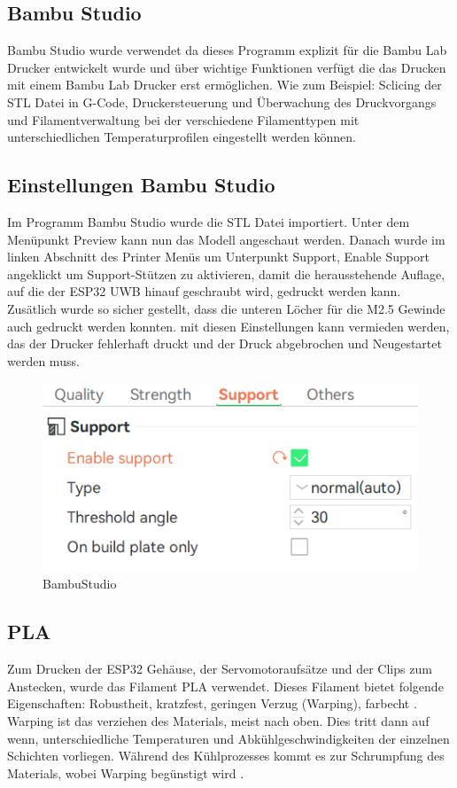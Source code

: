 \subsection{Bambu Studio}
Bambu Studio wurde verwendet da dieses Programm explizit für die Bambu Lab Drucker entwickelt wurde und über wichtige Funktionen verfügt die das Drucken mit einem Bambu Lab Drucker erst ermöglichen. Wie zum Beispiel: Sclicing der STL Datei in G-Code, Druckersteuerung und Überwachung des Druckvorgangs und Filamentverwaltung bei der verschiedene Filamenttypen mit unterschiedlichen Temperaturprofilen eingestellt werden können.


\subsection{Einstellungen Bambu Studio}
Im Programm Bambu Studio wurde die STL Datei importiert. Unter dem Menüpunkt Preview kann nun das Modell angeschaut werden. Danach wurde im linken Abschnitt des Printer Menüs um Unterpunkt Support, Enable Support angeklickt um Support-Stützen zu aktivieren, damit die herausstehende Auflage, auf die der ESP32 UWB hinauf geschraubt wird, gedruckt werden kann. Zusätlich wurde so sicher gestellt, dass die unteren Löcher für die M2.5 Gewinde auch gedruckt werden konnten. mit diesen Einstellungen kann vermieden werden, das der Drucker fehlerhaft druckt und der Druck abgebrochen und Neugestartet werden muss.

\begin{figure}[H]
	\centering
	\includegraphics[width=0.5\linewidth]{images/BambuStudio.jpg}
	\caption[BambuStudio]{BambuStudio}
	\label{fig:BambuStudio} 
\end{figure}

\subsection{PLA}
Zum Drucken der ESP32 Gehäuse, der Servomotoraufsätze und der Clips zum Anstecken, wurde das Filament PLA verwendet. Dieses Filament bietet folgende Eigenschaften: Robustheit, kratzfest, geringen Verzug (Warping), farbecht \parencite{PLAEigenschaften}. Warping ist das verziehen des Materials, meist nach oben. Dies tritt dann auf wenn, unterschiedliche Temperaturen und Abkühlgeschwindigkeiten der einzelnen Schichten vorliegen. Während des Kühlprozesses kommt es zur Schrumpfung des Materials, wobei Warping begünstigt wird \parencite{Warping}.

